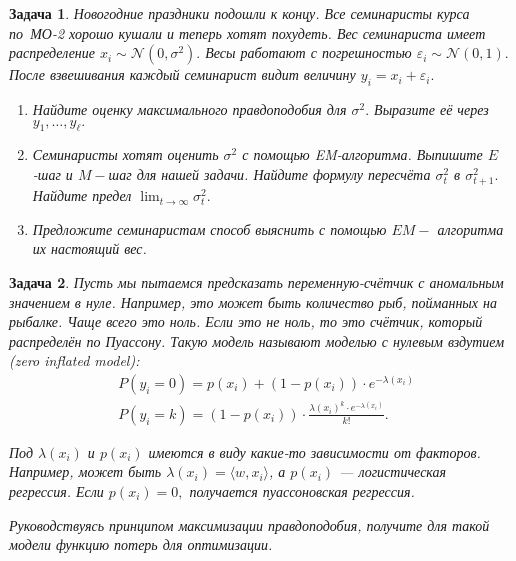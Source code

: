 \documentclass[12pt,fleqn]{article}
\newtheorem{esProblem}{Задача}
\begin{document}
\begin{esProblem}
    Новогодние праздники подошли к концу. Все семинаристы курса по~МО-2 хорошо кушали и теперь хотят похудеть. Вес семинариста имеет распределение $x_i \sim \mathcal{N}(0, \sigma^2).$ Весы работают с погрешностью $\varepsilon_i \sim \mathcal{N}(0,1).$ После взвешивания каждый семинарист видит величину  $y_i = x_i + \varepsilon_i.$ 
    \begin{enumerate} 
        \item[а)] Найдите оценку максимального правдоподобия для $\sigma^2.$ Выразите её через $y_1, \ldots, y_{\ell}.$
        
        \item[б)] Семинаристы хотят оценить $\sigma^2$ с помощью EM-алгоритма. Выпишите $E$-шаг и $M-$шаг для нашей задачи. Найдите формулу пересчёта $\sigma^2_t$ в $\sigma^2_{t+1}.$ Найдите предел $\lim_{t \to \infty} \sigma^2_t.$
        
        \item[в)] Предложите семинаристам способ выяснить с помощью $EM-$ алгоритма их настоящий вес. 
    \end{enumerate}
\end{esProblem}

\begin{esProblem}
    Пусть мы пытаемся предсказать переменную-счётчик с аномальным значением в нуле. Например, это может быть количество рыб, пойманных на рыбалке. Чаще всего это ноль. Если это не ноль, то это счётчик, который распределён по Пуассону. Такую модель называют \textit{моделью с нулевым вздутием (zero inflated model)}:
    \begin{equation*}
        \begin{aligned}
            & P(y_i = 0) = p(x_i) + (1 - p(x_i))\cdot e^{-\lambda(x_i)}\\
            & P(y_i = k) = (1 - p(x_i))\cdot \frac{\lambda(x_i)^k \cdot e^{-\lambda(x_i)}}{k!}.
        \end{aligned}
    \end{equation*}
    
    Под $\lambda(x_i)$ и $p(x_i)$ имеются в виду какие-то зависимости от факторов. Например, может быть $\lambda(x_i) = \langle w, x_i \rangle$, а $p(x_i)$ --- логистическая регрессия. Если $p(x_i) = 0,$ получается пуассоновская регрессия. 
    
    Руководствуясь принципом максимизации правдоподобия, получите для такой модели функцию потерь для оптимизации.
\end{esProblem}
\end{document}
